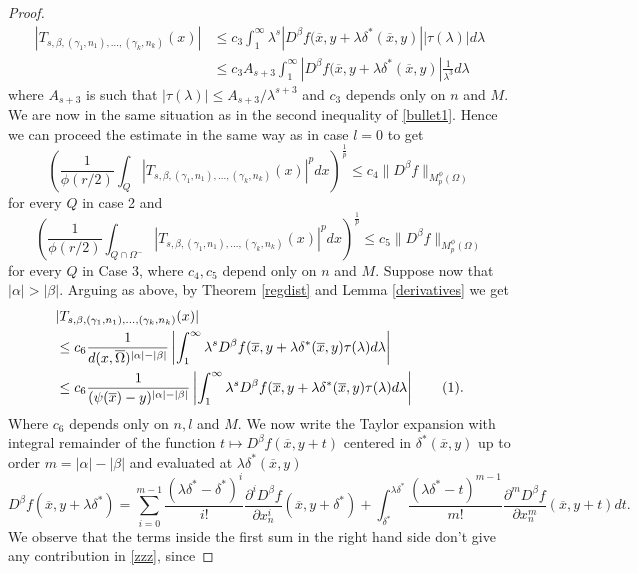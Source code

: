 \documentclass[12pt]{article}
\theoremstyle{definition}
\newcommand\addtag{\refstepcounter{equation}\tag{\theequation}}
\begin{document}
\begin{proof}
\begin{align*}
 |T_{s,\beta,(\gamma_1,n_1),...,(\gamma_k,n_k)}(x) | &\le c_3 \int_1^\infty\lambda^s |D^\beta f(\overline x, y+\lambda \delta^*(\overline x, y)| |\tau(\lambda)|d\lambda \\
&\le c_3A_{s+3} \int_1^\infty|D^\beta f(\overline x, y+\lambda \delta^*(\overline x, y)| \frac{1}{\lambda^3}d\lambda
\end{align*}
where  $A_{s+3}$ is such that $|\tau(\lambda)|\le A_{s+3}/\lambda^{s+3}$ and  $c_3$ depends only  on $n$ and $M.$ We are now in the same situation as in the second inequality of \eqref{bullet1}. Hence we can proceed the estimate in the same way as in case $l=0$ to get 
\[\left( \frac{1}{\phi(r/2)}\int_Q  \left| T_{s,\beta,(\gamma_1,n_1),...,(\gamma_k,n_k)}(x)\right|^p dx\right )^{\frac{1}{p}} \le c_4 \| D^\beta f \|_{M_p^\phi(\Omega)} \] 
for every $Q$ in case 2 and
\[\left( \frac{1}{\phi(r/2)}\int_{Q \cap \Omega^-}  \left| T_{s,\beta,(\gamma_1,n_1),...,(\gamma_k,n_k)}(x)\right|^p dx\right )^{\frac{1}{p}} \le c_5 \| D^\beta f \|_{M_p^\phi(\Omega)} \] 
 for every $Q$ in Case 3, where $c_4,c_5$ depend only on $n$ and $M.$
Suppose now that $|\alpha|>|\beta|.$ Arguing as above, by Theorem \ref{regdist} and Lemma \ref{derivatives} we get
\begin{align*}
&|T_{s,\beta,(\gamma_1,n_1),...,(\gamma_k,n_k)}(x) | \\
&\le c_6 \frac{1}{d(x,\overline \Omega)^{|\alpha|-|\beta|}} \left|\int_1^\infty \lambda^sD^\beta f(\overline x, y+\lambda \delta^*(\overline x, y)\tau(\lambda)d\lambda \right| \\
& \le  c_6 \frac{1}{(\psi(\overline x)-y)^{|\alpha|-|\beta|}} \left |\int_1^\infty \lambda^s D^\beta f(\overline x, y+\lambda \delta^*(\overline x, y) \tau(\lambda)d\lambda \right |\addtag \label{zzz} .   
\end{align*}
Where $c_6$ depends only on $n,l$ and $M$. We now write the Taylor expansion with integral remainder of the function $t \mapsto D^\beta f(\overline x, y+t)$ centered in $\delta^*(\overline x,y)$ up to order $m=|\alpha|-|\beta|$ and evaluated at $\lambda \delta^*(\overline x,y)$
\[
D^\beta f(\overline x, y+\lambda \delta^*) =\sum_{i=0}^{m-1} \frac{(\lambda \delta^*-\delta^*)^i}{i!}\frac{\partial^i D^\beta f}{\partial x_n^i}(\overline x,y+\delta^*) +\int_{\delta^*}^{\lambda \delta^*} \frac{(\lambda \delta^*-t)^{m-1}}{m!}\frac{\partial^{m} D^\beta f}{\partial x_n^{m} }(\overline x,y+t)dt. 
\]
We observe that the terms inside the first sum in the right hand side don't give any contribution in \eqref{zzz}, since

\end{proof}
\end{document}

